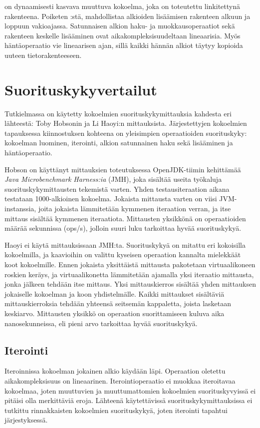  on dynaamisesti kasvava muuttuva kokoelma, joka on toteutettu linkitettynä rakenteena. Poiketen :stä,  mahdollistaa alkioiden lisäämisen rakenteen alkuun ja loppuun vakioajassa. Satunnaisen alkion haku- ja muokkausoperaatiot sekä rakenteen keskelle lisääminen ovat aikakompleksisuudeltaan lineaarisia. Myös häntäoperaatio vie lineaarisen ajan, sillä kaikki hännän alkiot täytyy kopioida uuteen tietorakenteeseen.
\cite{scalaCollections}


\section{Suorituskykyvertailut}
Tutkielmassa on käytetty kokoelmien suorituskykymittauksia kahdesta eri lähteestä: Toby Hobsonin\cite{hobsonBenchmark} ja Li Haoyi:n\cite{haoyiBenchmark} mittauksista. Järjestettyjen kokoelmien tapauksessa kiinnostuksen kohteena on yleisimpien operaatioiden suorituskyky: kokoelman luominen, iterointi, alkion satunnainen haku sekä lisääminen ja häntäoperaatio. 

Hobson\cite{hobsonBenchmark} on käyttänyt mittauksien toteutuksessa OpenJDK-tiimin kehittämää \textit{Java Microbenchmark Harness:ia} (JMH), joka sisältää useita työkaluja suorituskykymittausten tekemistä varten. Yhden testausiteraation aikana testataan 1000-alkioinen kokoelma. Jokaista mittausta varten on viisi JVM-instanssia, joita jokaista lämmitetään kymmenen iteraation verran, ja itse mittaus sisältää kymmenen iteraatiota. Mittausten yksikkönä on operaatioiden määrää sekunnissa (ops/s), jolloin suuri luku tarkoittaa hyvää suorituskykyä.
\cite{highPerformanceProgramming}

Haoyi ei käytä mittauksissaan\cite{haoyiBenchmark} JMH:ta. Suorituskykyä on mitattu eri kokoisilla kokoelmilla, ja kaavioihin on valittu kyseisen operaation kannalta mielekkäät koot kokoelmille. Ennen jokaista yksittäistä mittausta pakotetaan virtuaalikoneen roskien keräys, ja virtuaalikonetta lämmitetään ajamalla yksi iteraatio mittausta, jonka jälkeen tehdään itse mittaus. Yksi mittauskierros sisältää yhden mittauksen jokaiselle kokoelman ja koon yhdistelmälle. Kaikki mittaukset sisältäviä mittauskierroksia tehdään yhteensä seitsemän kappaletta, joista lasketaan keskiarvo. Mittausten yksikkö on operaation suorittamiseen kuluva aika nanosekunneissa, eli pieni arvo tarkoittaa hyvää suorituskykyä. 


\subsection{Iterointi}
Iteroinnissa kokoelman jokainen alkio käydään läpi. Operaation oletettu aikakompleksisuus on lineaarinen. Iterointioperaatio ei muokkaa iteroitavaa kokoelmaa, joten muuttuvien ja muuttumattomien kokoelmien suorituskyvyissä ei pitäisi olla merkittäviä eroja. Lähteenä käytettävissä suorituskykymittauksissa ei tutkittu rinnakkaisten kokoelmien suorituskykyä, joten iterointi tapahtui järjestyksessä.

